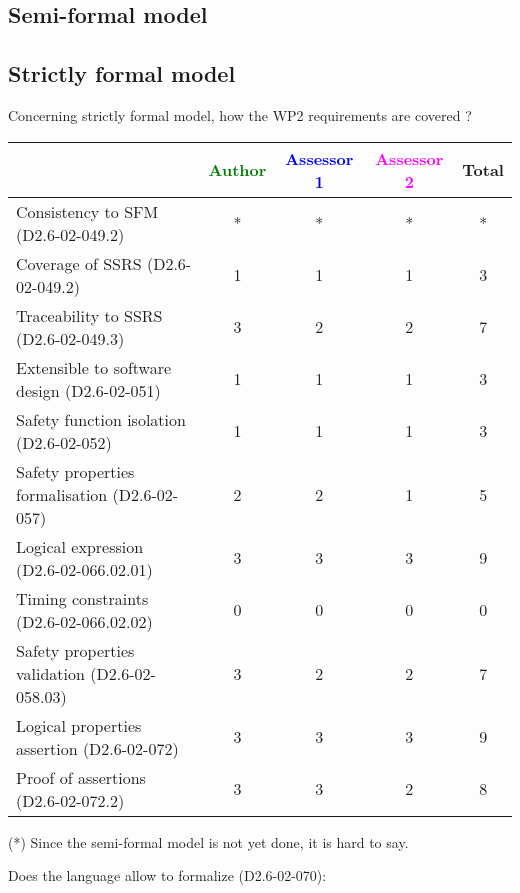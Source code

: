 \subsection{Semi-formal model}

\begin{comment}
Section has been skipped.
\end{comment}

\subsection{Strictly formal model}

Concerning strictly formal model, how the WP2 requirements are covered ?

\begin{tabular}{|l | c | c | c | c|}
\hline
& \textcolor{green}{Author} & \textcolor{blue}{Assessor 1} & \textcolor{magenta}{Assessor 2} & Total \\
\hline 
Consistency to SFM (D2.6-02-049.2) &* &* & *&  * \\
\hline
Coverage of SSRS (D2.6-02-049.2)  &1 &1 & 1& 3  \\
\hline
Traceability to  SSRS (D2.6-02-049.3)  &3 &2 & 2& 7 \\
\hline
Extensible to software design (D2.6-02-051)  &1 &1 & 1& 3  \\
\hline
Safety function isolation (D2.6-02-052)  &1 &1 & 1& 3 \\
\hline 
Safety properties formalisation (D2.6-02-057)  &2 &2 & 1& 5 \\
\hline
Logical expression (D2.6-02-066.02.01)  &3 &3 & 3& 9 \\
\hline
Timing constraints (D2.6-02-066.02.02)  &0 &0 & 0& 0 \\
\hline
Safety properties validation (D2.6-02-058.03)  &3 &2 & 2& 7 \\
\hline
Logical properties assertion (D2.6-02-072)  &3 &3 & 3& 9 \\
\hline
Proof of assertions (D2.6-02-072.2)  &3 &3 & 2& 8 \\
\hline
\end{tabular}

\begin{author_comment}
(*) Since the semi-formal model is not yet done, it is hard to say.
\end{author_comment}
Does the language allow to  formalize (D2.6-02-070):

